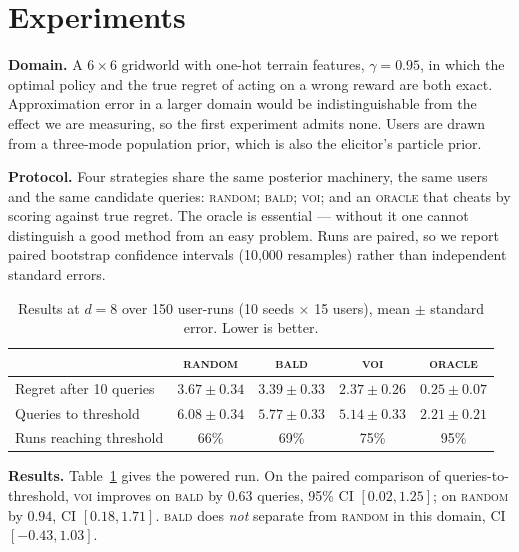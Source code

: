 \documentclass[10pt]{article}
\begin{document}
\section{Experiments}

\textbf{Domain.} A $6{\times}6$ gridworld with one-hot terrain features,
$\gamma = 0.95$, in which the optimal policy and the true regret of acting on a
wrong reward are both exact. Approximation error in a larger domain would be
indistinguishable from the effect we are measuring, so the first experiment
admits none. Users are drawn from a three-mode population prior, which is also
the elicitor's particle prior.

\textbf{Protocol.} Four strategies share the same posterior machinery, the same
users and the same candidate queries: \textsc{random}; \textsc{bald};
\textsc{voi}; and an \textsc{oracle} that cheats by scoring against true regret.
The oracle is essential --- without it one cannot distinguish a good method from
an easy problem. Runs are paired, so we report paired bootstrap confidence
intervals (10{,}000 resamples) rather than independent standard errors.

\begin{table}[t]
\centering
\small
\begin{tabular}{lcccc}
\toprule
& \textsc{random} & \textsc{bald} & \textsc{voi} & \textsc{oracle} \\
\midrule
Regret after 10 queries & $3.67 \pm 0.34$ & $3.39 \pm 0.33$ & $\mathbf{2.37 \pm 0.26}$ & $0.25 \pm 0.07$ \\ %
Queries to threshold    & $6.08 \pm 0.34$ & $5.77 \pm 0.33$ & $\mathbf{5.14 \pm 0.33}$ & $2.21 \pm 0.21$ \\ %
Runs reaching threshold & 66\% & 69\% & 75\% & 95\% \\
\bottomrule
\end{tabular}
\caption{Results at $d{=}8$ over 150 user-runs (10 seeds $\times$ 15 users),
mean $\pm$ standard error. Lower is better.}
\label{tab:main}
\end{table}

\textbf{Results.} Table~\ref{tab:main} gives the powered run. On the paired
comparison of queries-to-threshold, \textsc{voi} improves on \textsc{bald} by
$0.63$ queries, 95\% CI $[0.02, 1.25]$; %
on \textsc{random} by $0.94$, CI
$[0.18, 1.71]$. \textsc{bald} does \emph{not} separate from \textsc{random} in
this domain, CI $[-0.43, 1.03]$.
\end{document}
